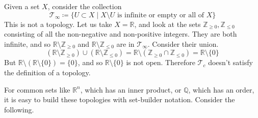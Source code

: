     \begin{example}
      Given a set $X$, consider the collection 
      \begin{equation}
        \mathscr{T}_\infty \coloneqq \{U \subset X \mid X \setminus U \text{ is infinite or empty or all of }X \}
      \end{equation}
      This is not a topology. Let us take $X = \mathbb{R}$, and look at the sets $\mathbb{Z}_{\geq 0}, \mathbb{Z}_{\leq 0}$ consisting of all the non-negative and non-positive integers. They are both infinite, and so $\mathbb{R} \setminus \mathbb{Z}_{\geq 0}$ and $\mathbb{R} \setminus \mathbb{Z}_{\leq 0}$ are in $\mathcal{T}_\infty$. Consider their union. 
      \begin{equation}
        (\mathbb{R} \setminus \mathbb{Z}_{\geq 0}) \cup (\mathbb{R} \setminus \mathbb{Z}_{\leq 0}) = \mathbb{R} \setminus (\mathbb{Z}_{\geq 0} \cap \mathbb{Z}_{\leq 0}) = \mathbb{R} \setminus \{0\}
      \end{equation}
      But $\mathbb{R} \setminus (\mathbb{R} \setminus \{0\}) = \{0\}$, and so $\mathbb{R} \setminus \{0\}$ is not open. Therefore $\mathcal{T}_c$ doesn't satisfy the definition of a topology. 
    \end{example}

    For common sets like $\mathbb{R}^n$, which has an inner product, or $\mathbb{Q}$, which has an order, it is easy to build these topologies with set-builder notation. Consider the following. 

